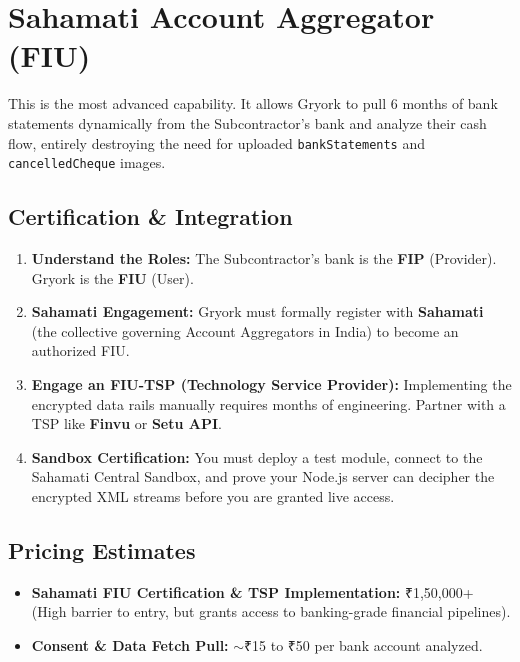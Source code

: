 \documentclass[11pt, a4paper]{report}
\begin{document}
\chapter{Sahamati Account Aggregator (FIU)}

This is the most advanced capability. It allows Gryork to pull 6 months of bank statements dynamically from the Subcontractor's bank and analyze their cash flow, entirely destroying the need for uploaded \texttt{bankStatements} and \texttt{cancelledCheque} images.

\section{Certification \& Integration}
\begin{enumerate}[label=\textbf{\textcolor{gryorkBlue}{\arabic*.}}, itemsep=0.3em]
    \item \textbf{Understand the Roles:} The Subcontractor’s bank is the \textbf{FIP} (Provider). Gryork is the \textbf{FIU} (User). 
    \item \textbf{Sahamati Engagement:} Gryork must formally register with \textbf{Sahamati} (the collective governing Account Aggregators in India) to become an authorized FIU.
    \item \textbf{Engage an FIU-TSP (Technology Service Provider):} Implementing the encrypted data rails manually requires months of engineering. Partner with a TSP like \textbf{Finvu} or \textbf{Setu API}.
    \item \textbf{Sandbox Certification:} You must deploy a test module, connect to the Sahamati Central Sandbox, and prove your Node.js server can decipher the encrypted XML streams before you are granted live access.
\end{enumerate}

\section{Pricing Estimates}
\begin{itemize}
    \item \textbf{Sahamati FIU Certification \& TSP Implementation:} ₹1,50,000+ (High barrier to entry, but grants access to banking-grade financial pipelines).
    \item \textbf{Consent \& Data Fetch Pull:} $\sim$₹15 to ₹50 per bank account analyzed.
\end{itemize}
\end{document}
